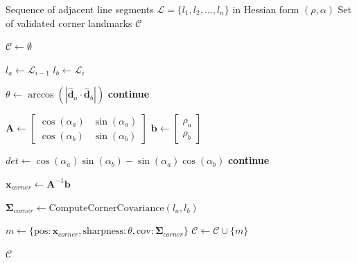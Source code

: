 \documentclass[11pt]{article}
\begin{document}
\begin{algorithm}
	\caption{Landmark Corner Extraction and Intersection Solver}
	\label{alg:corner_extraction}
	\begin{algorithmic}[1]
		\Require Sequence of adjacent line segments $\mathcal{L} = \{l_1, l_2, \dots, l_n\}$ in Hessian form $(\rho, \alpha)$
		\Ensure Set of validated corner landmarks $\mathcal{C}$
		
		\State $\mathcal{C} \gets \emptyset$
		
		\State $l_{a} \gets \mathcal{L}_{i-1}$
		\State $l_{b} \gets \mathcal{L}_{i}$
		
		\State {}
		\State $\theta \gets \arccos(|\hat{\mathbf{d}}_a \cdot \hat{\mathbf{d}}_b|)$ 
		\State \textbf{continue} 
		\EndIf
		
		\State {}
		\State $\mathbf{A} \gets \begin{bmatrix} \cos(\alpha_a) & \sin(\alpha_a) \\ \cos(\alpha_b) & \sin(\alpha_b) \end{bmatrix}$
		\State $\mathbf{b} \gets \begin{bmatrix} \rho_a \\ \rho_b \end{bmatrix}$
		
		\State $det \gets \cos(\alpha_a)\sin(\alpha_b) - \sin(\alpha_a)\cos(\alpha_b)$
		\State \textbf{continue} 
		\EndIf
		
		\State $\mathbf{x}_{corner} \gets \mathbf{A}^{-1}\mathbf{b}$ 
		
		\State {}
		\State $\mathbf{\Sigma}_{corner} \gets \text{ComputeCornerCovariance}(l_a, l_b)$
		
		\State $m \gets \{ \text{pos}: \mathbf{x}_{corner}, \text{sharpness}: \theta, \text{cov}: \mathbf{\Sigma}_{corner} \}$
		\State $\mathcal{C} \gets \mathcal{C} \cup \{m\}$
		\EndIf
		\EndFor
		
		\Return $\mathcal{C}$
	\end{algorithmic}
\end{algorithm}
\end{document}
